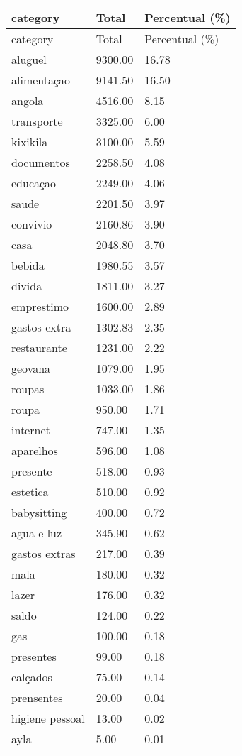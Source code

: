 \documentclass[
  8pt,
  a4paper,
  DIV=11,
  numbers=noendperiod]{scrartcl}
\begin{document}
\begin{figure}
\begin{minipage}{0.50\linewidth}
\begin{longtable}[]{@{}lll@{}}
\caption{}\label{T_d83ea}\tabularnewline
\toprule\noalign{}
category & Total & Percentual (\%) \\
\midrule\noalign{}
\endfirsthead
\toprule\noalign{}
category & Total & Percentual (\%) \\
\midrule\noalign{}
\endhead
\bottomrule\noalign{}
\endlastfoot
aluguel & 9300.00 & 16.78 \\
alimentaçao & 9141.50 & 16.50 \\
angola & 4516.00 & 8.15 \\
transporte & 3325.00 & 6.00 \\
kixikila & 3100.00 & 5.59 \\
documentos & 2258.50 & 4.08 \\
educaçao & 2249.00 & 4.06 \\
saude & 2201.50 & 3.97 \\
convivio & 2160.86 & 3.90 \\
casa & 2048.80 & 3.70 \\
bebida & 1980.55 & 3.57 \\
divida & 1811.00 & 3.27 \\
emprestimo & 1600.00 & 2.89 \\
gastos extra & 1302.83 & 2.35 \\
restaurante & 1231.00 & 2.22 \\
geovana & 1079.00 & 1.95 \\
roupas & 1033.00 & 1.86 \\
roupa & 950.00 & 1.71 \\
internet & 747.00 & 1.35 \\
aparelhos & 596.00 & 1.08 \\
presente & 518.00 & 0.93 \\
estetica & 510.00 & 0.92 \\
babysitting & 400.00 & 0.72 \\
agua e luz & 345.90 & 0.62 \\
gastos extras & 217.00 & 0.39 \\
mala & 180.00 & 0.32 \\
lazer & 176.00 & 0.32 \\
saldo & 124.00 & 0.22 \\
gas & 100.00 & 0.18 \\
presentes & 99.00 & 0.18 \\
calçados & 75.00 & 0.14 \\
prensentes & 20.00 & 0.04 \\
higiene pessoal & 13.00 & 0.02 \\
ayla & 5.00 & 0.01 \\
\end{longtable}


\end{minipage}
\end{figure}
\end{document}
